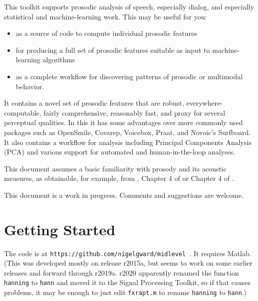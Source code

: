 \documentclass[11pt]{article}
\begin{document}
This toolkit supports prosodic analysis of speech, especially dialog,
and especially statistical and machine-learning work.
This may be useful for you:
\begin{itemize}\setlength{\itemsep}{0pt}\setlength{\parskip}{0pt}
\item as a source of code to compute individual
prosodic features 
\item for producing a full set of prosodic features
suitable as input to machine-learning algorithms 
\item as a complete
workflow for discovering patterns of prosodic or multimodal behavior.
\end{itemize}
It contains a novel set of prosodic features that are robust,
everywhere-computable, fairly comprehensive, reasonably fast, and
proxy for several perceptual qualities.  In this it has some
advantages over more commonly used packages such as OpenSmile,
Covarep, Voicebox, Praat, and Novoic's Surfboard. It also contains a
workflow for analysis including Principal Components Analysis (PCA)
and various support for automated and human-in-the-loop analyses.

This document assumes a basic familiarity with prosody and its
acoustic measures, as obtainable, for example, from \cite{me-cup},
Chapter 4 of \cite{ogden-phonetics} or Chapter 4 of
\cite{ladefoged03}.

This document is a work in progress.  Comments and suggestions are
welcome.


\section{Getting Started}  \label{sec:starting}

The code is at {\tt https://github.com/nigelgward/midlevel }.  It requires
 Matlab. (This was developed mostly on release r2015a, but seems to
 work on some earlier releases and forward through r2019a.  r2020
 apparently renamed the function {\tt hanning} to {\tt hann} and moved
 it to the Signal Processing Toolkit, so if that causes problems, it
 may be enough to just edit {\tt fxrapt.m} to rename {\tt hanning} to
 {\tt hann}.)

\end{document}
